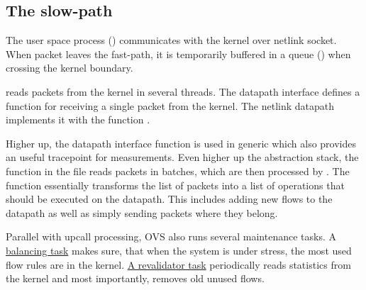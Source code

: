 \subsection{The slow-path}
\label{the-slow-path}

The user space process (\href{https://www.man7.org/linux/man-pages/man8/ovs-vswitchd.8.html}{}) communicates with the kernel over netlink socket. When packet leaves the
fast-path, it is temporarily buffered in a queue (\href{https://elixir.bootlin.com/linux/v6.2.6/source/net/openvswitch/datapath.c\#L311}{}) when crossing the kernel boundary.

 reads packets from the kernel in several threads. The datapath interface defines a \href{https://github.com/openvswitch/ovs/blob/e90a0727f17f6ad915a32735a8c0b282f2c8cd6f/lib/dpif-provider.h\#L387-L408}{} function for receiving a single packet from the kernel. The netlink datapath implements it with the function \href{https://github.com/openvswitch/ovs/blob/e90a0727f17f6ad915a32735a8c0b282f2c8cd6f/lib/dpif-netlink.c\#L3132-L3134}{}.

Higher up, the  datapath interface function is used in generic \href{https://github.com/openvswitch/ovs/blob/e90a0727f17f6ad915a32735a8c0b282f2c8cd6f/lib/dpif.c\#L1591-L1611}{} which also provides an useful tracepoint \href{https://github.com/openvswitch/ovs/blob/e90a0727f17f6ad915a32735a8c0b282f2c8cd6f/lib/dpif.c\#L1618}{} for measurements. Even higher up the abstraction stack, the function \href{https://github.com/openvswitch/ovs/blob/e90a0727f17f6ad915a32735a8c0b282f2c8cd6f/ofproto/ofproto-dpif-upcall.c\#L829-L830}{} in the file  reads packets in batches, which are then processed by \href{https://github.com/openvswitch/ovs/blob/e90a0727f17f6ad915a32735a8c0b282f2c8cd6f/ofproto/ofproto-dpif-upcall.c\#L1639-L1641}{}. The  function essentially transforms the list of packets into a list of operations that should be executed on the datapath. This includes adding new flows to the datapath as well as simply sending packets where they belong.

Parallel with upcall processing, OVS also runs several maintenance tasks. A \href{https://github.com/openvswitch/ovs/blob/e90a0727f17f6ad915a32735a8c0b282f2c8cd6f/ofproto/ofproto-dpif-upcall.c\#L3312-L3336}{balancing task} makes sure, that when the system is under stress, the most used flow rules are in the kernel. \href{https://github.com/openvswitch/ovs/blob/e90a0727f17f6ad915a32735a8c0b282f2c8cd6f/ofproto/ofproto-dpif-upcall.c\#L83-L111}{A revalidator task} periodically reads statistics from the kernel and most importantly, removes old unused flows.

